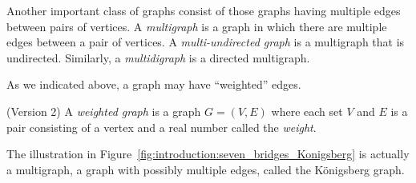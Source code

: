 Another important class of graphs consist of those graphs having
multiple edges between pairs of vertices. A \emph{multigraph} is a
graph in which there are multiple edges between a pair of vertices. A
\emph{multi-undirected graph} is a multigraph that is
undirected. Similarly, a \emph{multidigraph} is a directed
multigraph.

As we indicated above, a graph may have ``weighted''
edges.

\begin{definition} (Version 2)
{\rm
A \emph{weighted graph} is a graph $G = (V, E)$
where each set $V$ and $E$ is a pair consisting of a vertex and a real
number called the \emph{weight}.
}
\end{definition}

The illustration in
Figure~\ref{fig:introduction:seven_bridges_Konigsberg} is actually a
multigraph, a graph with possibly multiple edges,
called the K\"onigsberg graph.

